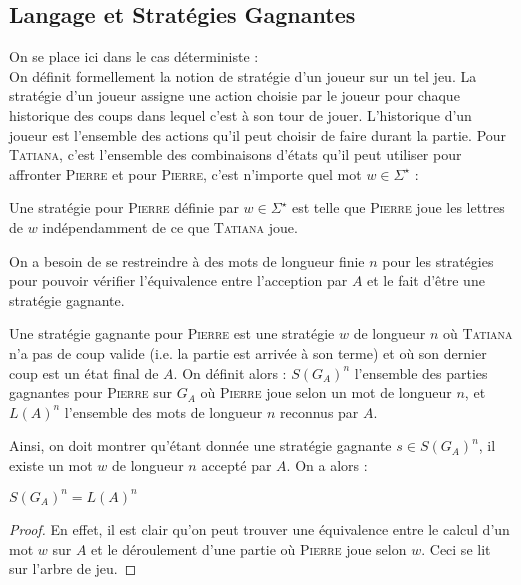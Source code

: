 \documentclass{cours}
\begin{document}
\subsection{Langage et Stratégies Gagnantes}
On se place ici dans le cas déterministe :\\
On définit formellement la notion de stratégie d'un joueur sur un tel jeu. La stratégie d'un joueur assigne une action choisie par le joueur pour chaque historique des coups dans lequel c'est à son tour de jouer. L'historique d'un joueur est l'ensemble des actions qu'il peut choisir de faire durant la partie. Pour \textsc{Tatiana}, c'est l'ensemble des combinaisons d'états qu'il peut utiliser pour affronter \textsc{Pierre} et pour \textsc{Pierre}, c'est n'importe quel mot $w \in \Sigma^{\star}$ :
\begin{definition}
    Une stratégie pour \textsc{Pierre} définie par $w \in \Sigma^{\star}$ est telle que \textsc{Pierre} joue les lettres de $w$ indépendamment de ce que \textsc{Tatiana} joue.
\end{definition}
On a besoin de se restreindre à des mots de longueur finie $n$ pour les stratégies pour pouvoir vérifier l'équivalence entre l'acception par $A$ et le fait d'être une stratégie gagnante.
\begin{definition}
    Une stratégie gagnante pour \textsc{Pierre} est une stratégie $w$ de longueur $n$ où \textsc{Tatiana} n'a pas de coup valide (i.e. la partie est arrivée à son terme) et où son dernier coup est un état final de $A$.
    On définit alors : $S\left(G_{A}\right)^{n}$ l'ensemble des parties gagnantes pour \textsc{Pierre} sur $G_{A}$ où \textsc{Pierre} joue selon un mot de longueur $n$, et $L(A)^{n}$ l'ensemble des mots de longueur $n$ reconnus par $A$.
\end{definition}

Ainsi, on doit montrer qu'étant donnée une stratégie gagnante $s \in S\left(G_{A}\right)^{n}$, il existe un mot $w$ de longueur $n$ accepté par $A$.
On a alors :
\begin{theorem}
    $S(G_{A})^{n} = L(A)^{n}$
\end{theorem}
\begin{proof}
    En effet, il est clair qu'on peut trouver une équivalence entre le calcul d'un mot $w$ sur $A$ et le déroulement d'une partie où \textsc{Pierre} joue selon $w$. Ceci se lit sur l'arbre de jeu.
\end{proof}
\end{document}
